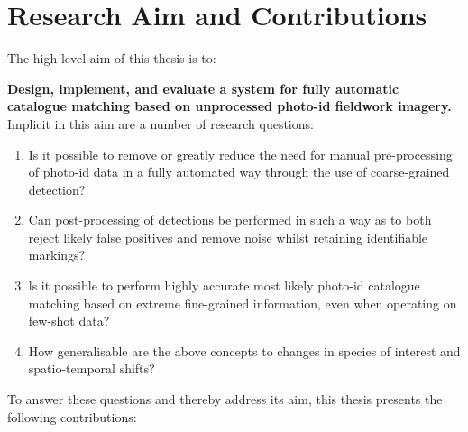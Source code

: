 \section{Research Aim and Contributions}\label{ch:intro,sec:AimsAndContributions}

The high level aim of this thesis is to:

\begin{flushleft}
	\textbf{Design, implement, and evaluate a system for fully automatic catalogue matching based on unprocessed photo-id fieldwork imagery.}
	\bigbreak\noindent Implicit in this aim are a number of research questions:
\end{flushleft}

\begin{enumerate}
	\item Is it possible to remove or greatly reduce the need for manual pre-processing of photo-id data in a fully automated way through the use of coarse-grained detection?
	\item Can post-processing of detections be performed in such a way as to both reject likely false positives and remove noise whilst retaining identifiable markings?
	\item ls it possible to perform highly accurate most likely photo-id catalogue matching based on extreme fine-grained information, even when operating on few-shot data?
	\item How generalisable are the above concepts to changes in species of interest and spatio-temporal shifts?
\end{enumerate}

\newpage

\noindent To answer these questions and thereby address its aim, this thesis presents the following contributions:

